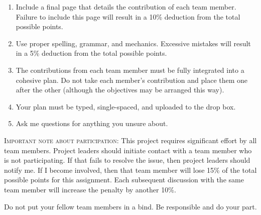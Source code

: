 \documentclass[12pt, hidelinks]{exam}
\begin{document}
\begin{enumerate}[label=\textsc{\alph*}.]
	
	\item Include a final page that details the contribution of each team member. Failure to include this page will result in a 10\% deduction from the total possible points.
	
	\item Use proper spelling, grammar, and mechanics. Excessive mistakes will result in a 5\% deduction from the total possible points.
	
	\item The contributions from each team member must be fully integrated into a cohesive plan. Do not take each member's contribution and place them one after the other (although the objectives may be arranged this way). 
	
	\item Your plan must be typed, single-spaced, and uploaded to the drop box.
	
	\item Ask me questions for anything you unsure about.
	
\end{enumerate}

\textsc{Important note about participation}: This project requires significant effort by all team members. Project leaders should initiate contact with a team member who is not participating. If that fails to resolve the issue, then project leaders should notify me. If I become involved, then that team member will lose 15\% of the total possible
points for this assignment. Each subsequent discussion with the same team member will increase the penalty by another 10\%. 

Do not put your fellow team members in a bind. Be responsible and do your part.
\end{document}
